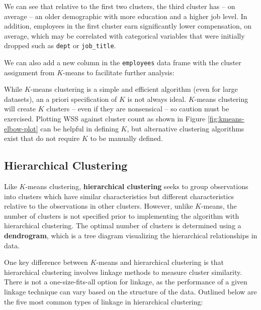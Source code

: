 \documentclass[
]{book}
\newenvironment{Shaded}{\begin{snugshade}}{\end{snugshade}}
\newcommand{\AttributeTok}[1]{\textcolor[rgb]{0.77,0.63,0.00}{#1}}
\newcommand{\CommentTok}[1]{\textcolor[rgb]{0.56,0.35,0.01}{\textit{#1}}}
\newcommand{\FunctionTok}[1]{\textcolor[rgb]{0.00,0.00,0.00}{#1}}
\newcommand{\NormalTok}[1]{#1}
\newcommand{\OtherTok}[1]{\textcolor[rgb]{0.56,0.35,0.01}{#1}}
\newcommand{\SpecialCharTok}[1]{\textcolor[rgb]{0.00,0.00,0.00}{#1}}
\begin{document}
We can see that relative to the first two clusters, the third cluster has -- on average -- an older demographic with more education and a higher job level. In addition, employees in the first cluster earn significantly lower compensation, on average, which may be correlated with categorical variables that were initially dropped such as \texttt{dept} or \texttt{job\_title}.

We can also add a new column in the \texttt{employees} data frame with the cluster assignment from \(K\)-means to facilitate further analysis:

\begin{Shaded}
\end{Shaded}

While \(K\)-means clustering is a simple and efficient algorithm (even for large datasets), an a priori specification of \(K\) is not always ideal. \(K\)-means clustering will create \(K\) clusters -- even if they are nonsensical -- so caution must be exercised. Plotting WSS against cluster count as shown in Figure \ref{fig:kmeans-elbow-plot} can be helpful in defining \(K\), but alternative clustering algorithms exist that do not require \(K\) to be manually defined.

\hypertarget{hierarchical-clustering}{%
\subsection{Hierarchical Clustering}\label{hierarchical-clustering}}

Like \(K\)-means clustering, \textbf{hierarchical clustering} seeks to group observations into clusters which have similar characteristics but different characteristics relative to the observations in other clusters. However, unlike \(K\)-means, the number of clusters is not specified prior to implementing the algorithm with hierarchical clustering. The optimal number of clusters is determined using a \textbf{dendrogram}, which is a tree diagram visualizing the hierarchical relationships in data.

One key difference between \(K\)-means and hierarchical clustering is that hierarchical clustering involves linkage methods to measure cluster similarity. There is not a one-size-fits-all option for linkage, as the performance of a given linkage technique can vary based on the structure of the data. Outlined below are the five most common types of linkage in hierarchical clustering:
\end{document}
